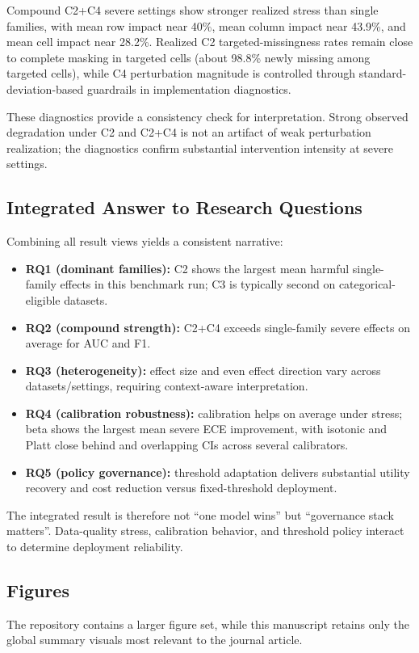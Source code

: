 \documentclass{AuthorGuide/ijitcs}
\begin{document}
Compound C2+C4 severe settings show stronger realized stress than single families, with mean row impact near 40\%, mean column impact near 43.9\%, and mean cell impact near 28.2\%. Realized C2 targeted-missingness rates remain close to complete masking in targeted cells (about 98.8\% newly missing among targeted cells), while C4 perturbation magnitude is controlled through standard-deviation-based guardrails in implementation diagnostics.

These diagnostics provide a consistency check for interpretation. Strong observed degradation under C2 and C2+C4 is not an artifact of weak perturbation realization; the diagnostics confirm substantial intervention intensity at severe settings.

\subsection{Integrated Answer to Research Questions}
Combining all result views yields a consistent narrative:
\begin{itemize}
\item \textbf{RQ1 (dominant families):} C2 shows the largest mean harmful single-family effects in this benchmark run; C3 is typically second on categorical-eligible datasets.
\item \textbf{RQ2 (compound strength):} C2+C4 exceeds single-family severe effects on average for AUC and F1.
\item \textbf{RQ3 (heterogeneity):} effect size and even effect direction vary across datasets/settings, requiring context-aware interpretation.
\item \textbf{RQ4 (calibration robustness):} calibration helps on average under stress; beta shows the largest mean severe ECE improvement, with isotonic and Platt close behind and overlapping CIs across several calibrators.
\item \textbf{RQ5 (policy governance):} threshold adaptation delivers substantial utility recovery and cost reduction versus fixed-threshold deployment.
\end{itemize}

The integrated result is therefore not ``one model wins'' but ``governance stack matters''. Data-quality stress, calibration behavior, and threshold policy interact to determine deployment reliability.

\subsection{Figures}
The repository contains a larger figure set, while this manuscript retains only the global summary visuals most relevant to the journal article.
\end{document}
